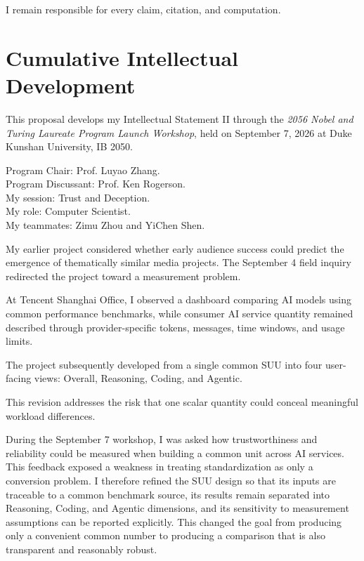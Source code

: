 \documentclass[sigconf,nonacm]{acmart}
\begin{document}
I remain responsible for every claim,
citation,
and computation.



\section{Cumulative Intellectual Development}

This proposal develops my Intellectual Statement II through the
\emph{2056 Nobel and Turing Laureate Program Launch Workshop},
held on September 7, 2026
at Duke Kunshan University, IB 2050.

\vspace{0.4em}

Program Chair:
Prof. Luyao Zhang.\\
Program Discussant:
Prof. Ken Rogerson.\\
My session:
Trust and Deception.\\
My role:
Computer Scientist.\\
My teammates:
Zimu Zhou and YiChen Shen.

\vspace{0.5em}

My earlier project considered whether early audience success could predict the
emergence of thematically similar media projects.
The September 4 field inquiry redirected the project toward a measurement
problem.

At Tencent Shanghai Office,
I observed a dashboard comparing AI models using common performance benchmarks,
while consumer AI service quantity remained described through
provider-specific tokens,
messages,
time windows,
and usage limits.

\vspace{0.5em}

The project subsequently developed from a single common SUU into four
user-facing views:
Overall,
Reasoning,
Coding,
and Agentic.

This revision addresses the risk that one scalar quantity could conceal
meaningful workload differences.

\vspace{0.5em}

During the September 7 workshop, I was asked how trustworthiness and reliability could be measured when building a common unit across AI services.
This feedback exposed a weakness in treating standardization as only a conversion problem. I therefore refined the SUU design so that its inputs are
traceable to a common benchmark source, its results remain separated into Reasoning, Coding, and Agentic dimensions, and its sensitivity to measurement
assumptions can be reported explicitly. This changed the goal from producing only a convenient common number to producing a comparison that is also transparent and reasonably robust.
\end{document}
